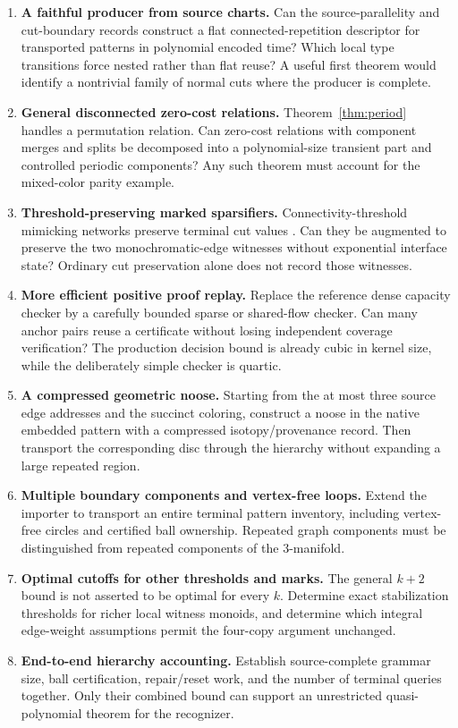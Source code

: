 \documentclass[11pt]{article}
\theoremstyle{remark}\newtheorem{remark}[theorem]{Remark}
\begin{document}
\begin{enumerate}[leftmargin=*,itemsep=0.7em]
\item \textbf{A faithful producer from source charts.} Can the source-parallelity and cut-boundary records construct a flat connected-repetition descriptor for transported patterns in polynomial encoded time? Which local type transitions force nested rather than flat reuse? A useful first theorem would identify a nontrivial family of normal cuts where the producer is complete.
\item \textbf{General disconnected zero-cost relations.} Theorem~\ref{thm:period} handles a permutation relation. Can zero-cost relations with component merges and splits be decomposed into a polynomial-size transient part and controlled periodic components? Any such theorem must account for the mixed-color parity example.
\item \textbf{Threshold-preserving marked sparsifiers.} Connectivity-threshold mimicking networks preserve terminal cut values \cite{mimicking2020}. Can they be augmented to preserve the two monochromatic-edge witnesses without exponential interface state? Ordinary cut preservation alone does not record those witnesses.
\item \textbf{More efficient positive proof replay.} Replace the reference dense capacity checker by a carefully bounded sparse or shared-flow checker. Can many anchor pairs reuse a certificate without losing independent coverage verification? The production decision bound is already cubic in kernel size, while the deliberately simple checker is quartic.
\item \textbf{A compressed geometric noose.} Starting from the at most three source edge addresses and the succinct coloring, construct a noose in the native embedded pattern with a compressed isotopy/provenance record. Then transport the corresponding disc through the hierarchy without expanding a large repeated region.
\item \textbf{Multiple boundary components and vertex-free loops.} Extend the importer to transport an entire terminal pattern inventory, including vertex-free circles and certified ball ownership. Repeated graph components must be distinguished from repeated components of the 3-manifold.
\item \textbf{Optimal cutoffs for other thresholds and marks.} The general $k+2$ bound is not asserted to be optimal for every $k$. Determine exact stabilization thresholds for richer local witness monoids, and determine which integral edge-weight assumptions permit the four-copy argument unchanged.
\item \textbf{End-to-end hierarchy accounting.} Establish source-complete grammar size, ball certification, repair/reset work, and the number of terminal queries together. Only their combined bound can support an unrestricted quasi-polynomial theorem for the recognizer.
\end{enumerate}
\end{document}
